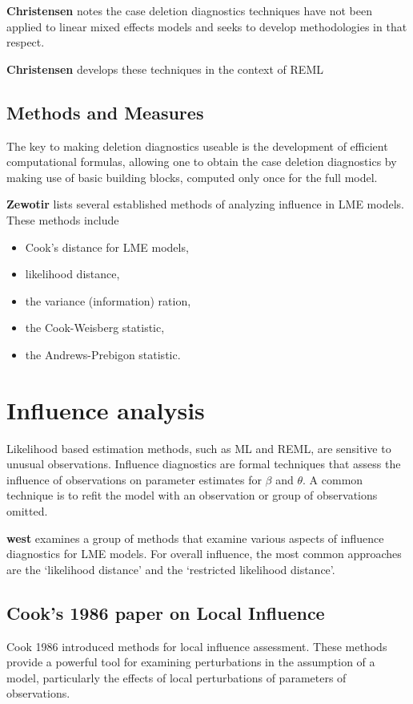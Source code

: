 \documentclass[a4paper,12pt]{article}
\begin{document}
\textbf{Christensen} notes the case deletion diagnostics techniques have not been applied to linear mixed effects models and seeks to develop methodologies in that respect.

\textbf{Christensen} develops these techniques in the context of REML

\subsection{Methods and Measures}
The key to making deletion diagnostics useable is the development of efficient computational formulas, allowing one to obtain the  case deletion diagnostics by making use of basic building blocks, computed only once for the full model.

\textbf{Zewotir} lists several established methods of analyzing influence in LME models. These methods include 
\begin{itemize}
	\item Cook's distance for LME models,
	\item {} likelihood distance,
	\item the variance (information) ration,
	\item the  Cook-Weisberg statistic,
	\item the  Andrews-Prebigon statistic.
\end{itemize}


\newpage
\section{Influence analysis} %

Likelihood based estimation methods, such as ML and REML, are sensitive to unusual observations. Influence diagnostics are formal techniques that assess the influence of observations on parameter estimates for $\beta$ and $\theta$. A common technique is to refit the model with an observation or group of observations omitted.

\textbf{west} examines a group of methods that examine various aspects of influence diagnostics for LME models. For overall influence, the most common approaches are the `likelihood distance' and the `restricted likelihood distance'.

\subsection{Cook's 1986 paper on Local Influence}%
Cook 1986 introduced methods for local influence assessment. These methods provide a powerful tool for examining perturbations in the assumption of a model, particularly the effects of local perturbations of parameters of observations.
\end{document}
